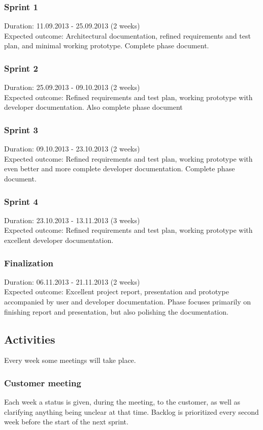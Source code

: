 \documentclass[11pt]{book}
\begin{document}
\subsubsection{Sprint 1}
Duration: 11.09.2013 - 25.09.2013 (2 weeks)\\
Expected outcome: Architectural documentation, refined requirements and test plan, and minimal working prototype. Complete phase document.

\subsubsection{Sprint 2}
Duration: 25.09.2013 - 09.10.2013 (2 weeks)\\
Expected outcome: Refined requirements and test plan, working prototype with developer documentation. Also complete phase document

\subsubsection{Sprint 3}
Duration: 09.10.2013 - 23.10.2013 (2 weeks)\\
Expected outcome: Refined requirements and test plan, working prototype with even better and more complete developer documentation. Complete phase document.

\subsubsection{Sprint 4}
Duration: 23.10.2013 - 13.11.2013 (3 weeks)\\
Expected outcome: Refined requirements and test plan, working prototype with excellent developer documentation.

\subsubsection{Finalization}
Duration: 06.11.2013 - 21.11.2013 (2 weeks)\\
Expected outcome: Excellent project report, presentation and prototype accompanied by user and developer documentation. Phase focuses primarily on finishing report and presentation, but also polishing the documentation.

\subsection{Activities}
Every week some meetings will take place.

\subsubsection{Customer meeting}
Each week a status is given, during the meeting, to the customer, as well as clarifying anything being unclear at that time. Backlog is prioritized every second week before the start of the next sprint.
\end{document}
